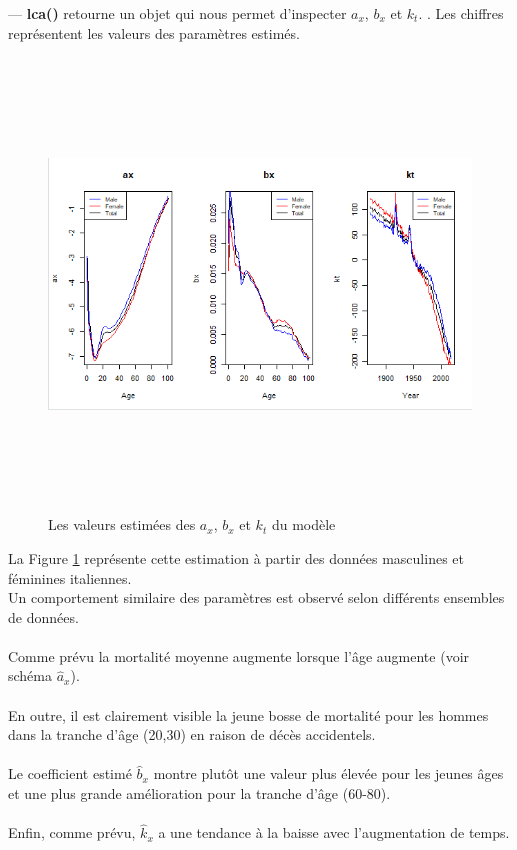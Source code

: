 \documentclass[french]{report}
\begin{document}
\newline--- \textbf{lca()} retourne un objet qui nous permet d'inspecter  ${a}_{x}$, ${{b}}_{x}$ et ${k}_{t}$.
. Les chiffres représentent les valeurs des paramètres estimés.

\begin{figure}[hhhhhhhh!]
    \centering
    \includegraphics[width=15cm, height=12cm]{lca_function_estimation_parametres.png}
    \caption{Les valeurs estimées des  ${a}_{x}$, ${{b}}_{x}$ et ${k}_{t}$ du modèle}
    \label{fig:lca_estimation.png}
\end{figure}

La Figure \ref{fig:lca_estimation.png}  représente cette estimation à partir des données masculines et féminines italiennes.\\
\newline
Un comportement similaire des paramètres est observé selon différents ensembles de données.\\
\\
Comme prévu la mortalité moyenne augmente lorsque l'âge augmente (voir schéma $\hat{{a}}_{x}$).\\
\\
En outre, il est clairement visible la jeune bosse de mortalité pour les hommes dans la tranche d'âge (20,30) en raison de décès accidentels.\\
\\
Le coefficient estimé $\hat{{b}}_{x}$ montre plutôt une valeur plus élevée pour les jeunes âges et une plus grande amélioration pour la tranche d'âge (60-80).\\
\\
Enfin, comme prévu, $\hat{{k}}_{x}$ a une tendance à la baisse avec l'augmentation de temps.\\
\newline
\end{document}
